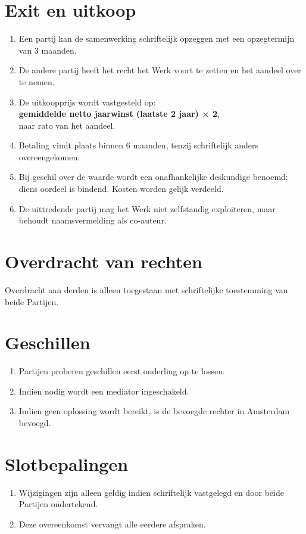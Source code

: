 \documentclass[11pt]{article}
\begin{document}
\section{Exit en uitkoop} 

\begin{enumerate} 
    \item Een partij kan de samenwerking schriftelijk opzeggen met een opzegtermijn van 3 maanden. 
    \item De andere partij heeft het recht het Werk voort te zetten en het aandeel over te nemen. 
    \item De uitkoopprijs wordt vastgesteld op:\\ \textbf{gemiddelde netto jaarwinst (laatste 2 jaar) × 2}, \\naar rato van het aandeel. 
    \item Betaling vindt plaats binnen 6 maanden, tenzij schriftelijk anders overeengekomen. 
    \item Bij geschil over de waarde wordt een onafhankelijke deskundige benoemd; diens oordeel is bindend. Kosten worden gelijk verdeeld. 
    \item De uittredende partij mag het Werk niet zelfstandig exploiteren, maar behoudt naamsvermelding als co-auteur. 
\end{enumerate} 

\section{Overdracht van rechten} Overdracht aan derden is alleen toegestaan met schriftelijke toestemming van beide Partijen. 

\section{Geschillen} 

\begin{enumerate} 
    \item Partijen proberen geschillen eerst onderling op te lossen. 
    \item Indien nodig wordt een mediator ingeschakeld. 
    \item Indien geen oplossing wordt bereikt, is de bevoegde rechter in Amsterdam bevoegd. 
\end{enumerate} 
        
\section{Slotbepalingen} 
    \begin{enumerate} 
        \item Wijzigingen zijn alleen geldig indien schriftelijk vastgelegd en door beide Partijen ondertekend. 
        \item Deze overeenkomst vervangt alle eerdere afspraken. 
\end{enumerate} 
\end{document}
